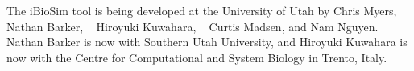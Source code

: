 \documentclass[titlepage,11pt]{article}
\begin{document}
\noindent
The iBioSim tool is being developed at the University of Utah
by 
Chris Myers,
~
Nathan Barker,
~
Hiroyuki Kuwahara,
~
Curtis Madsen,
and
Nam Nguyen.
Nathan Barker is now with Southern Utah University, and Hiroyuki
Kuwahara is now with the Centre for Computational and System
Biology in Trento, Italy. 
  
\end{document}
